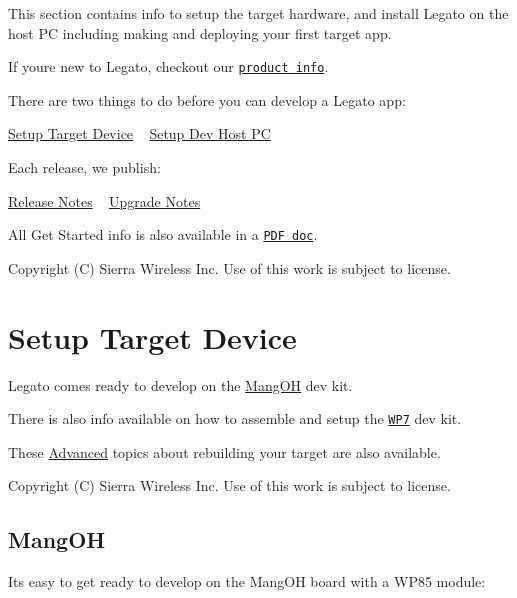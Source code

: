 This section contains info to setup the target hardware, and install Legato on the host P\+C including making and deploying your first target app.





If you\textquotesingle{}re new to Legato, checkout our \href{http://www.sierrawireless.com/productsandservices/airprime_wireless_modules/smart_modules/legato/}{\tt product info}.





There are two things to do before you can develop a Legato app\+:

\hyperlink{getstartedTargetMain}{Setup Target Device} ~\newline
 \hyperlink{getstartedSetupHost}{Setup Dev Host P\+C}





Each release, we publish\+:

\hyperlink{legatoRelNotesBeta}{Release Notes} ~\newline
 \hyperlink{legatoUpgradeBeta}{Upgrade Notes}





All Get Started info is also available in a \href{http://source.sierrawireless.com/Resources/Resources/Legato/GettingStarted.aspx}{\tt P\+D\+F doc}.





Copyright (C) Sierra Wireless Inc. Use of this work is subject to license. \hypertarget{getstartedTargetMain}{}\section{Setup Target Device}\label{getstartedTargetMain}
Legato comes ready to develop on the \hyperlink{getstartedMangOH}{Mang\+O\+H} dev kit.

There is also info available on how to assemble and setup the \href{http://source.sierrawireless.com/resources/legato/wp7xdevkit/}{\tt W\+P7} dev kit.





These \hyperlink{getstartedAdvanced}{Advanced} topics about rebuilding your target are also available.





Copyright (C) Sierra Wireless Inc. Use of this work is subject to license. \hypertarget{getstartedMangOH}{}\subsection{Mang\+O\+H}\label{getstartedMangOH}
It\textquotesingle{}s easy to get ready to develop on the Mang\+O\+H board with a W\+P85 module\+:

